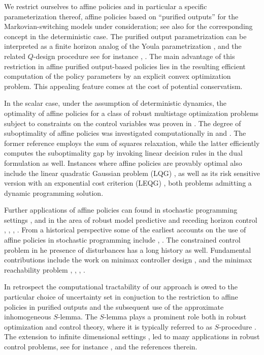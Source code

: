 \documentclass[letterpaper,11pt]{article}
\begin{document}
We restrict ourselves to affine policies and in particular a specific parameterization thereof, affine policies based on ``purified outputs'' for the Markovian-switching models under consideration; see also \cite{bental2} for the corresponding concept in the deterministic case.  The purified output parametrization can be interpreted as a finite horizon analog of the Youla parametrization \cite{youla1}, \cite{youla2} and the related $Q$-design procedure see for instance \cite{barratt}, \cite{vid}.
The main advantage of this restriction in affine purified output-based policies 
lies in the resulting efficient computation of the policy parameters by an explicit convex optimization problem. This appealing feature comes at the cost of potential conservatism.

In the scalar case, under the assumption of deterministic dynamics, the optimality of affine policies for a class of robust multistage
optimization problems subject to constraints on the control variables was proven in 
\cite{bertsimas2}.  The degree of suboptimality of affine policies was investigated computationally in \cite{bertsimas3} and \cite{kuhn}. The former reference employs 
the sum of squares relaxation, while the latter efficiently computes the suboptimality gap by invoking linear decision rules in the dual formulation as well. 
Instances  where affine policies are provably 
optimal also include the linear quadratic Gaussian problem (LQG) \cite{kwakernaak}, \cite{andreson} 
as well as its risk sensitive version with an exponential cost criterion (LEQG) \cite{whittle2}, both problems admitting
a dynamic programming solution.  

Further applications of affine policies can found in stochastic programming settings \cite{sun}, \cite{nemirovski}
and in the area of robust model predictive and receding horizon control \cite{loefberg}, \cite{goulart1}, \cite{goulart2},
\cite{skaf}.  From a historical perspective  some of the earliest accounts on the use of affine policies in stochastic programming 
include \cite{charnes}, \cite{gartska}. The constrained control problem in he presence of disturbances has a long history as well. 
Fundamental contributions include the work on minimax controller design \cite{salm}, \cite{wits} and the minimax reachability 
problem \cite{glover}, \cite{ber2}, \cite{ber3}, \cite{ber4}. 

In retrospect the computational tractability of our approach is owed to the particular choice of uncertainty set in conjuction to the restriction to affine policies in purified outputs 
and the subsequent use of the approximate inhomogeneous $S$-lemma. The $S$-lemma plays a prominent role both in robust optimization and control theory, where it is typically referred to as $S$-procedure \cite{yakubovich1}. The extension to infinite dimensional settings \cite{meg}, \cite{yakubovich2} led to many applications in robust control problems, see for instance \cite{fer}, \cite{savkin} and the references therein. 
\end{document}
